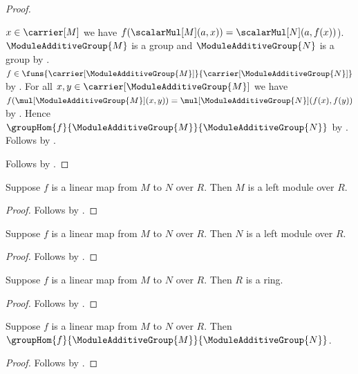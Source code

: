 \begin{proof}
\begin{subproof}
                $x\in\carrier[M]$ we have
                $f(\scalarMul[M](a,x))=\scalarMul[N](a,f(x))$).
        $\ModuleAdditiveGroup{M}$ is a group and
            $\ModuleAdditiveGroup{N}$ is a group by
            .
        $f\in\funs{\carrier[\ModuleAdditiveGroup{M}]}{
            \carrier[\ModuleAdditiveGroup{N}]}$ by
            .
        For all $x,y\in\carrier[\ModuleAdditiveGroup{M}]$ we have
            $f(\mul[\ModuleAdditiveGroup{M}](x,y))
                =\mul[\ModuleAdditiveGroup{N}](f(x),f(y))$ by
            .
        Hence $\groupHom{f}{\ModuleAdditiveGroup{M}}{
            \ModuleAdditiveGroup{N}}$ by .
        Follows by .
    \end{subproof}
    Follows by \auto.
\end{proof}

\begin{proposition}\label{linear_map_source_module}
    Suppose $f$ is a linear map from $M$ to $N$ over $R$.
    Then $M$ is a left module over $R$.
\end{proposition}
\begin{proof}
    Follows by .
\end{proof}

\begin{proposition}\label{linear_map_target_module}
    Suppose $f$ is a linear map from $M$ to $N$ over $R$.
    Then $N$ is a left module over $R$.
\end{proposition}
\begin{proof}
    Follows by .
\end{proof}

\begin{proposition}\label{linear_map_scalar_ring}
    Suppose $f$ is a linear map from $M$ to $N$ over $R$.
    Then $R$ is a ring.
\end{proposition}
\begin{proof}
    Follows by
        .
\end{proof}

\begin{proposition}\label{linear_map_is_additive_group_hom}
    Suppose $f$ is a linear map from $M$ to $N$ over $R$.
    Then $\groupHom{f}{\ModuleAdditiveGroup{M}}{
        \ModuleAdditiveGroup{N}}$.
\end{proposition}
\begin{proof}
    Follows by .
\end{proof}


